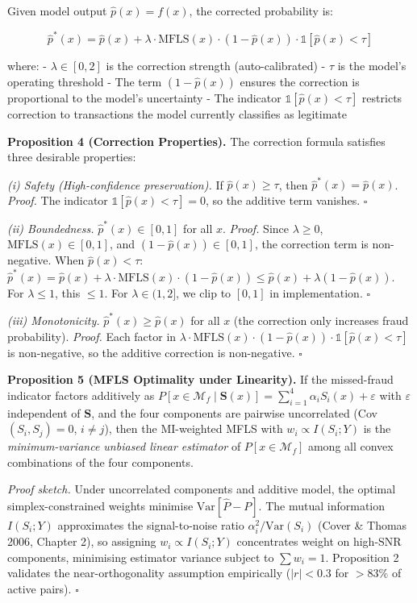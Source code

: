 \documentclass[
  11pt,
]{article}
\begin{document}
Given model output \(\hat{p}(x) = f(x)\), the corrected probability is:

\[\hat{p}^*(x) = \hat{p}(x) + \lambda \cdot \text{MFLS}(x) \cdot (1 - \hat{p}(x)) \cdot \mathbb{1}[\hat{p}(x) < \tau]\]

where: - \(\lambda \in [0, 2]\) is the correction strength
(auto-calibrated) - \(\tau\) is the model’s operating threshold - The
term \((1 - \hat{p}(x))\) ensures the correction is proportional to the
model’s uncertainty - The indicator \(\mathbb{1}[\hat{p}(x) < \tau]\)
restricts correction to transactions the model currently classifies as
legitimate

\textbf{Proposition 4 (Correction Properties).} The correction formula
satisfies three desirable properties:

\emph{(i) Safety (High-confidence preservation).} If
\(\hat{p}(x) \geq \tau\), then \(\hat{p}^*(x) = \hat{p}(x)\).
\emph{Proof.} The indicator \(\mathbb{1}[\hat{p}(x) < \tau] = 0\), so
the additive term vanishes. \(\square\)

\emph{(ii) Boundedness.} \(\hat{p}^*(x) \in [0, 1]\) for all \(x\).
\emph{Proof.} Since \(\lambda \geq 0\), \(\text{MFLS}(x) \in [0,1]\),
and \((1 - \hat{p}(x)) \in [0,1]\), the correction term is non-negative.
When \(\hat{p}(x) < \tau\):
\(\hat{p}^*(x) = \hat{p}(x) + \lambda \cdot \text{MFLS}(x) \cdot (1 - \hat{p}(x)) \leq \hat{p}(x) + \lambda(1 - \hat{p}(x))\).
For \(\lambda \leq 1\), this \(\leq 1\). For \(\lambda \in (1, 2]\), we
clip to \([0,1]\) in implementation. \(\square\)

\emph{(iii) Monotonicity.} \(\hat{p}^*(x) \geq \hat{p}(x)\) for all
\(x\) (the correction only increases fraud probability). \emph{Proof.}
Each factor in
\(\lambda \cdot \text{MFLS}(x) \cdot (1 - \hat{p}(x)) \cdot \mathbb{1}[\hat{p}(x) < \tau]\)
is non-negative, so the additive correction is non-negative. \(\square\)

\textbf{Proposition 5 (MFLS Optimality under Linearity).} If the
missed-fraud indicator factors additively as
\(P[x \in \mathcal{M}_f \mid \mathbf{S}(x)] = \sum_{i=1}^{4} \alpha_i S_i(x) + \varepsilon\)
with \(\varepsilon\) independent of \(\mathbf{S}\), and the four
components are pairwise uncorrelated (Cov\((S_i, S_j) = 0\),
\(i \neq j\)), then the MI-weighted MFLS with \(w_i \propto I(S_i; Y)\)
is the \emph{minimum-variance unbiased linear estimator} of
\(P[x \in \mathcal{M}_f]\) among all convex combinations of the four
components.

\emph{Proof sketch.} Under uncorrelated components and additive model,
the optimal simplex-constrained weights minimise
\(\text{Var}[\hat{P} - P]\). The mutual information \(I(S_i; Y)\)
approximates the signal-to-noise ratio \(\alpha_i^2 / \text{Var}(S_i)\)
(Cover \& Thomas 2006, Chapter 2), so assigning
\(w_i \propto I(S_i; Y)\) concentrates weight on high-SNR components,
minimising estimator variance subject to \(\sum w_i = 1\). Proposition 2
validates the near-orthogonality assumption empirically (\(|r| < 0.3\)
for \(> 83\%\) of active pairs). \(\square\)
\end{document}
